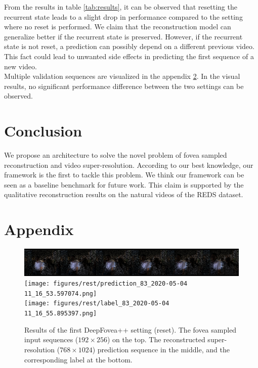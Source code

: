 \documentclass[10pt,twocolumn,letterpaper]{article}
\begin{document}
	From the results in table \ref{tab:results}, it can be observed that resetting the recurrent state leads to a slight drop in performance compared to the setting where no reset is performed. We claim that the reconstruction model can generalize better if the recurrent state is preserved. However, if the recurrent state is not reset, a prediction can possibly depend on a different previous video. This fact could lead to unwanted side effects in predicting the first sequence of a new video.\\
	Multiple validation sequences are visualized in the appendix \ref{sec:appendix}. In the visual results, no significant performance difference between the two settings can be observed. 
	
	\section{Conclusion} \label{sec:conclusion}
	We propose an architecture to solve the novel problem of fovea sampled reconstruction and video super-resolution. According to our best knowledge, our framework is the first to tackle this problem. We think our framework can be seen as a baseline benchmark for future work. This claim is supported by the qualitative reconstruction results on the natural videos of the REDS dataset.
	
	{\small
		
		
	}
	
	\section{Appendix} \label{sec:appendix}
	
	\begin{figure}[htbp!]
		\centering
		\includegraphics[width=\columnwidth]{figures/rest/input_83_2020-05-04 11_16_57.840082.png}\\\vspace{-0.1cm}
		\texttt{[image: figures/rest/prediction\_83\_2020-05-04 11\_16\_53.597074.png]}\\\vspace{-0.1cm}
		\texttt{[image: figures/rest/label\_83\_2020-05-04 11\_16\_55.895397.png]}\\
		\caption{Results of the first DeepFovea++ setting (reset). The fovea sampled input sequences ($192 \times 256$) on the top. The reconstructed super-resolution ($768 \times 1024$) prediction sequence in the middle, and the corresponding label at the bottom.}
		\label{fig:restresults1}
	\end{figure}
	
\end{document}
